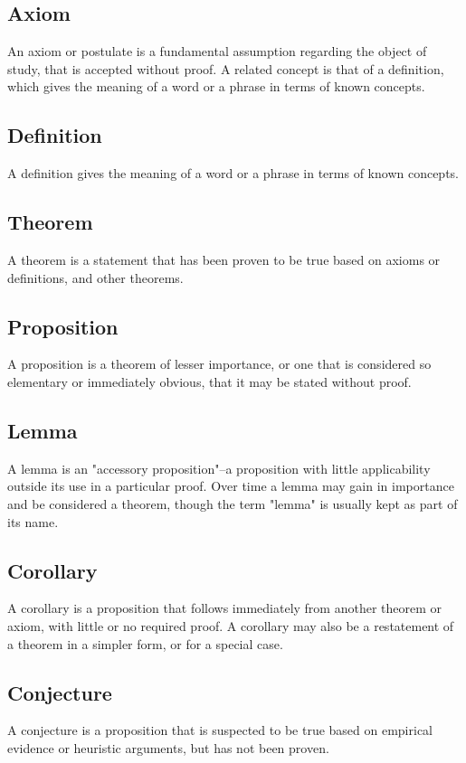 \documentclass[oneside,10pt]{book}
\begin{document}
\subsection{Axiom}
An axiom or postulate is a fundamental assumption regarding the object of study, that is accepted without proof. A related concept is that of a definition, which gives the meaning of a word or a phrase in terms of known concepts. 

\subsection{Definition}
A definition gives the meaning of a word or a phrase in terms of known concepts.

\subsection{Theorem}
A theorem is a statement that has been proven to be true based on axioms or definitions, and other theorems.

\subsection{Proposition}
A proposition is a theorem of lesser importance, or one that is considered so elementary or immediately obvious, that it may be stated without proof.

\subsection{Lemma}
A lemma is an "accessory proposition"--a proposition with little applicability outside its use in a particular proof. Over time a lemma may gain in importance and be considered a theorem, though the term "lemma" is usually kept as part of its name.

\subsection{Corollary}
A corollary is a proposition that follows immediately from another theorem or axiom, with little or no required proof. A corollary may also be a restatement of a theorem in a simpler form, or for a special case.

\subsection{Conjecture}
A conjecture is a proposition that is suspected to be true based on empirical evidence or heuristic arguments, but has not been proven.
\end{document}
